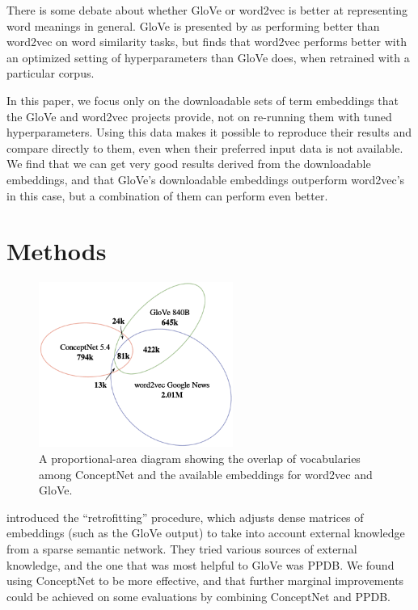 \documentclass[11pt,letterpaper]{article}
\begin{document}
There is some debate about whether GloVe or word2vec is better at representing
word meanings in general. GloVe is presented by 
as performing better than word2vec on word similarity tasks, but
 finds that word2vec performs better with an
optimized setting of hyperparameters than GloVe does, when retrained with a
particular corpus.

In this paper, we focus only on the downloadable sets of term embeddings that
the GloVe and word2vec projects provide, not on re-running them with tuned
hyperparameters. Using this data makes it possible to reproduce their results
and compare directly to them, even when their preferred input data is not
available. We find that we can get very good results derived from
the downloadable embeddings, and that GloVe's downloadable embeddings outperform
word2vec's in this case, but a combination of them can perform even better.

\section{Methods}

\begin{figure}
\centering
\includegraphics[width=2.5in]{areas.pdf}
\caption{
    A proportional-area diagram showing the overlap of vocabularies among
    ConceptNet and the available embeddings for word2vec and GloVe.
}
\label{vocabulary-overlap}
\end{figure}

 introduced the ``retrofitting'' procedure,
which adjusts dense matrices of embeddings (such as the GloVe output) to take
into account external knowledge from a sparse semantic network. They tried
various sources of external knowledge, and the one that was most helpful to
GloVe was PPDB.  We found using ConceptNet to be more effective, and that
further marginal improvements could be achieved on some evaluations by
combining ConceptNet and PPDB.
\end{document}
